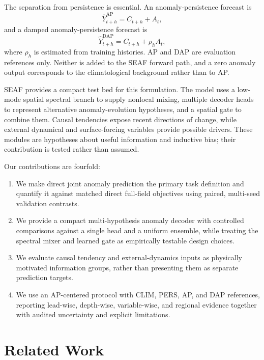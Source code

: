 \documentclass[conference]{IEEEtran}
\begin{document}
The separation from persistence is essential. An anomaly-persistence forecast is
\begin{equation}
\widehat{Y}^{\mathrm{AP}}_{t+h}=C_{t+h}+A_t,
\label{eq:intro_ap}
\end{equation}
and a damped anomaly-persistence forecast is
\begin{equation}
\widehat{Y}^{\mathrm{DAP}}_{t+h}=C_{t+h}+\rho_h A_t,
\label{eq:intro_dap}
\end{equation}
where $\rho_h$ is estimated from training histories. AP and DAP are evaluation references only. Neither is added to the SEAF forward path, and a zero anomaly output corresponds to the climatological background rather than to AP.

SEAF provides a compact test bed for this formulation. The model uses a low-mode spatial spectral branch to supply nonlocal mixing, multiple decoder heads to represent alternative anomaly-evolution hypotheses, and a spatial gate to combine them. Causal tendencies expose recent directions of change, while external dynamical and surface-forcing variables provide possible drivers. These modules are hypotheses about useful information and inductive bias; their contribution is tested rather than assumed.

Our contributions are fourfold:
\begin{enumerate}
    \item We make direct joint anomaly prediction the primary task definition and quantify it against matched direct full-field objectives using paired, multi-seed validation contrasts.
    \item We provide a compact multi-hypothesis anomaly decoder with controlled comparisons against a single head and a uniform ensemble, while treating the spectral mixer and learned gate as empirically testable design choices.
    \item We evaluate causal tendency and external-dynamics inputs as physically motivated information groups, rather than presenting them as separate prediction targets.
    \item We use an AP-centered protocol with CLIM, PERS, AP, and DAP references, reporting lead-wise, depth-wise, variable-wise, and regional evidence together with audited uncertainty and explicit limitations.
\end{enumerate}

\section{Related Work}
\end{document}
